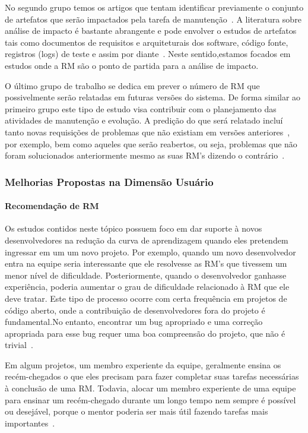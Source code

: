 No segundo grupo temos os artigos que tentam identificar previamente o conjunto
de artefatos que serão impactados pela tarefa de manutenção~\cite{Nagwani2010,
	ahsan2010impact}. A literatura sobre análise de impacto é bastante
abrangente e pode envolver o estudos de artefatos tais como documentos de
requisitos e arquiteturais dos software, código fonte, registros (logs) de teste
e assim por diante~\cite{cavalcanti2014challenges}. Neste sentido,estamos
focados em estudos onde a RM são o ponto de partida para a análise de impacto.

O último grupo de trabalho se dedica em prever o número de RM que possivelmente
serão relatadas em futuras versões do sistema. De forma similar ao primeiro
grupo este tipo de estudo visa contribuir com o planejamento das atividades de
manutenção e evolução. A predição do que será relatado incluí tanto novas
requisições de problemas que não existiam em versões
anteriores~\cite{song2006software}, por exemplo, bem como aqueles que serão
reabertos, ou seja, problemas que não foram solucionados anteriormente mesmo as
suas RM's dizendo o contrário~\cite{xia2015automatic}.

\subsubsection{Melhorias Propostas na Dimensão Usuário}
\label{ssub:melhorias_dim_usuario}

\paragraph{Recomendação de RM} Os estudos contidos neste tópico possuem foco em
dar suporte à novos desenvolvedores na redução da curva de aprendizagem quando
eles pretendem ingressar em um um novo projeto. Por exemplo, quando um novo
desenvolvedor entra na equipe seria interessante que ele resolvesse as RM's que
tivessem um menor nível de dificuldade. Posteriormente, quando o desenvolvedor
ganhasse experiência, poderia aumentar o grau de dificuldade relacionado à RM
que ele deve tratar. Este tipo de processo ocorre com certa frequência em
projetos de código aberto, onde a contribuição de desenvolvedores fora do
projeto é fundamental.No entanto, encontrar um bug apropriado e uma correção
apropriada para esse bug requer uma boa compreensão do projeto, que não é
trivial~\cite{Wang2011bug}.

Em algum projetos, um membro experiente da equipe, geralmente ensina os
recém-chegados o que eles precisam para fazer completar suas tarefas necessárias
à conclusão de uma RM\@. Todavia, alocar um membro experiente de uma equipe para
ensinar um recém-chegado durante um longo tempo nem sempre é possível ou
desejável, porque o mentor poderia ser mais útil fazendo tarefas mais
importantes~\cite{malheiros2012source}.

